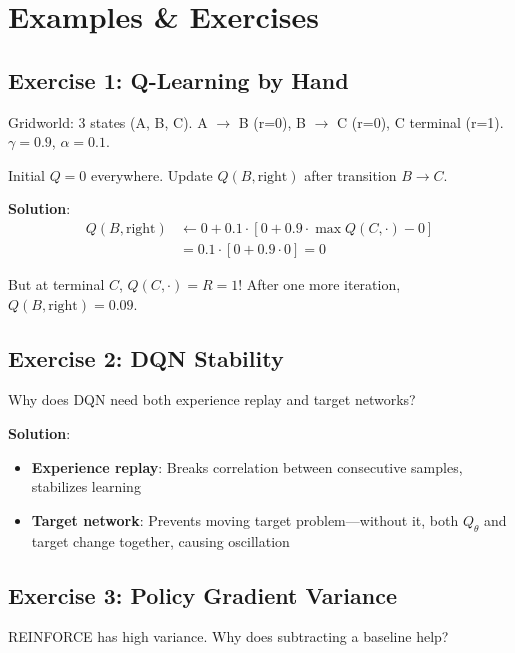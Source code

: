 
\section{Examples \& Exercises}

\subsection{Exercise 1: Q-Learning by Hand}

Gridworld: 3 states (A, B, C). A $\to$ B (r=0), B $\to$ C (r=0), C terminal (r=1). $\gamma = 0.9$, $\alpha = 0.1$.

Initial $Q = 0$ everywhere. Update $Q(B, \text{right})$ after transition $B \to C$.

\textbf{Solution}:
\begin{align*}
    Q(B, \text{right}) &\gets 0 + 0.1 \cdot [0 + 0.9 \cdot \max Q(C, \cdot) - 0] \\
    &= 0.1 \cdot [0 + 0.9 \cdot 0] = 0
\end{align*}

But at terminal $C$, $Q(C, \cdot) = R = 1$! After one more iteration, $Q(B, \text{right}) = 0.09$.

\subsection{Exercise 2: DQN Stability}

Why does DQN need both experience replay and target networks?

\textbf{Solution}:
\begin{itemize}
    \item \textbf{Experience replay}: Breaks correlation between consecutive samples, stabilizes learning
    \item \textbf{Target network}: Prevents moving target problem---without it, both $Q_\theta$ and target change together, causing oscillation
\end{itemize}

\subsection{Exercise 3: Policy Gradient Variance}

REINFORCE has high variance. Why does subtracting a baseline help?


